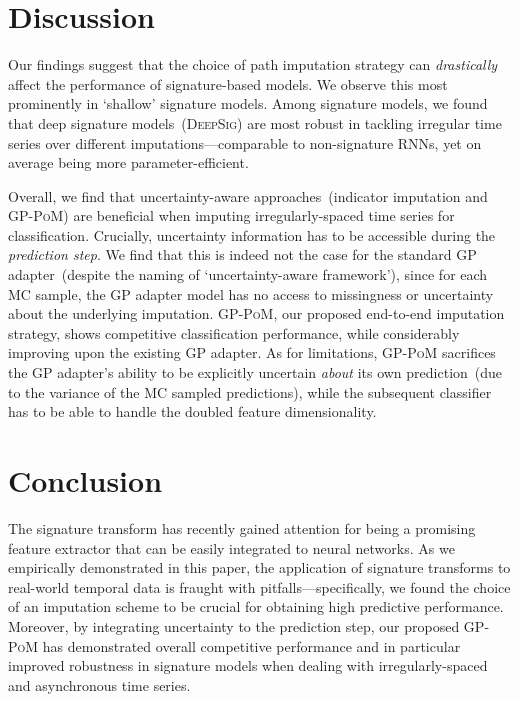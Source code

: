 \documentclass{article}
\begin{document}
\section{Discussion}

Our findings suggest that the choice of path imputation strategy can
\emph{drastically} affect the performance of signature-based models. We
observe this most prominently in `shallow' signature models. Among
signature models, we found that deep signature models~(\textsc{DeepSig})
are most robust in tackling irregular time series over different
imputations---comparable to non-signature RNNs, yet on average being
more parameter-efficient.

Overall, we find that uncertainty-aware approaches~(indicator
imputation and \textsc{GP-PoM}) are beneficial when imputing
irregularly-spaced time series for classification.
%
Crucially, uncertainty information has to be accessible during the
\emph{prediction step}. We find that this is indeed not the case for
the standard GP adapter~(despite the naming of `uncertainty-aware
framework'), since for each MC sample, the GP adapter model has no access
to missingness or uncertainty about the underlying imputation.
\textsc{GP-PoM}, our proposed end-to-end imputation strategy, shows
competitive classification performance, while considerably improving
upon the existing GP adapter. As for
limitations, \textsc{GP-PoM} sacrifices the GP adapter's ability to be
explicitly uncertain \emph{about} its own prediction~(due to the
variance of the MC sampled predictions), while the subsequent classifier
has to be able to handle the doubled feature dimensionality.

\section{Conclusion}

The signature transform has recently gained attention for being
a promising feature extractor that can be easily integrated to neural
networks. As we empirically demonstrated in this paper, the application
of signature transforms to real-world temporal data is fraught with
pitfalls---specifically, we found the choice of an imputation scheme to
be crucial for obtaining high predictive performance. Moreover, by integrating uncertainty to the prediction step, our proposed \textsc{GP-PoM} has demonstrated overall competitive performance and in particular improved robustness in signature models when dealing with irregularly-spaced and asynchronous time series. 
\end{document}
